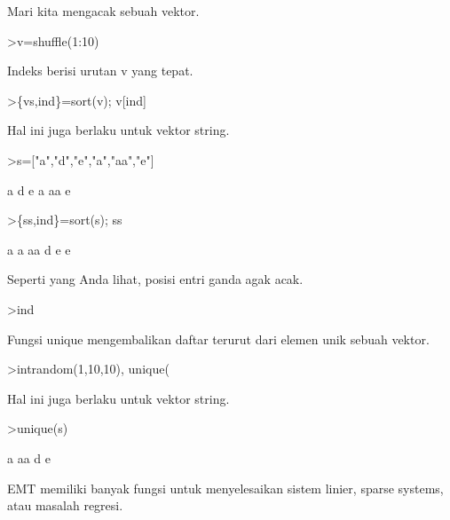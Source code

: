 \documentclass[a4paper,10pt]{article}
\begin{document}
\begin{eulernotebook}
\begin{eulercomment}
Mari kita mengacak sebuah vektor.
\end{eulercomment}
\begin{eulerprompt}
>v=shuffle(1:10)
\end{eulerprompt}
\begin{euleroutput}
  [4,  5,  10,  6,  8,  9,  1,  7,  2,  3]
\end{euleroutput}
\begin{eulercomment}
Indeks berisi urutan v yang tepat.
\end{eulercomment}
\begin{eulerprompt}
>\{vs,ind\}=sort(v); v[ind]
\end{eulerprompt}
\begin{euleroutput}
  [1,  2,  3,  4,  5,  6,  7,  8,  9,  10]
\end{euleroutput}
\begin{eulercomment}
Hal ini juga berlaku untuk vektor string.
\end{eulercomment}
\begin{eulerprompt}
>s=["a","d","e","a","aa","e"]
\end{eulerprompt}
\begin{euleroutput}
  a
  d
  e
  a
  aa
  e
\end{euleroutput}
\begin{eulerprompt}
>\{ss,ind\}=sort(s); ss
\end{eulerprompt}
\begin{euleroutput}
  a
  a
  aa
  d
  e
  e
\end{euleroutput}
\begin{eulercomment}
Seperti yang Anda lihat, posisi entri ganda agak acak.
\end{eulercomment}
\begin{eulerprompt}
>ind
\end{eulerprompt}
\begin{euleroutput}
  [4,  1,  5,  2,  6,  3]
\end{euleroutput}
\begin{eulercomment}
Fungsi unique mengembalikan daftar terurut dari elemen unik sebuah
vektor.
\end{eulercomment}
\begin{eulerprompt}
>intrandom(1,10,10), unique(%
\end{eulerprompt}
\begin{euleroutput}
  [4,  4,  9,  2,  6,  5,  10,  6,  5,  1]
  [1,  2,  4,  5,  6,  9,  10]
\end{euleroutput}
\begin{eulercomment}
Hal ini juga berlaku untuk vektor string.
\end{eulercomment}
\begin{eulerprompt}
>unique(s)
\end{eulerprompt}
\begin{euleroutput}
  a
  aa
  d
  e
\end{euleroutput}
\begin{eulercomment}
EMT memiliki banyak fungsi untuk menyelesaikan sistem linier, sparse
systems, atau masalah regresi.


\end{eulercomment}
\end{eulernotebook}
\end{document}
